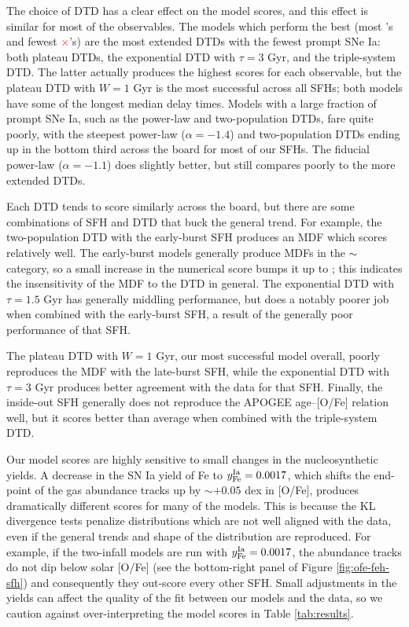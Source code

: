 \documentclass[twocolumn,twocolappendix,linenumbers]{aastex631}
\newcommand{\yes}{\textcolor{green}{\checkmark}\xspace}
\newcommand{\meh}{\textcolor{black}{$\sim$}\xspace}
\newcommand{\no}{\textcolor{red}{$\times$}\xspace}
\begin{document}
The choice of DTD has a clear effect on the model scores, and this effect is similar for most of the observables. The models which perform the best (most \yes's and fewest \no's) are the most extended DTDs with the fewest prompt SNe Ia: both plateau DTDs, the exponential DTD with $\tau=3$ Gyr, and the triple-system DTD. The latter actually produces the highest scores for each observable, but the plateau DTD with $W=1$ Gyr is the most successful across all SFHs; both models have some of the longest median delay times. Models with a large fraction of prompt SNe Ia, such as the power-law and two-population DTDs, fare quite poorly, with the steepest power-law ($\alpha=-1.4$) and two-population DTDs ending up in the bottom third across the board for most of our SFHs. The fiducial power-law ($\alpha=-1.1$) does slightly better, but still compares poorly to the more extended DTDs.

Each DTD tends to score similarly across the board, but there are some combinations of SFH and DTD that buck the general trend. For example, the two-population DTD with the early-burst SFH produces an MDF which scores relatively well. The early-burst models generally produce MDFs in the \meh category, so a small increase in the numerical score bumps it up to \yes; this indicates the insensitivity of the MDF to the DTD in general. The exponential DTD with $\tau=1.5$ Gyr has generally middling performance, but does a notably poorer job when combined with the early-burst SFH, a result of the generally poor performance of that SFH. 

The plateau DTD with $W=1$ Gyr, our most successful model overall, poorly reproduces the MDF with the late-burst SFH, while the exponential DTD with $\tau=3$ Gyr produces better agreement with the data for that SFH. Finally, the inside-out SFH generally does not reproduce the APOGEE age--[O/Fe] relation well, but it scores better than average when combined with the triple-system DTD.

Our model scores are highly sensitive to small changes in the nucleosynthetic yields. A decrease in the SN Ia yield of Fe to $y_{\rm Fe}^{\rm Ia}=0.0017$, which shifts the end-point of the gas abundance tracks up by $\sim+0.05$ dex in [O/Fe], produces dramatically different scores for many of the models. This is because the KL divergence tests penalize distributions which are not well aligned with the data, even if the general trends and shape of the distribution are reproduced. For example, if the two-infall models are run with $y_{\rm Fe}^{\rm Ia}=0.0017$, the abundance tracks do not dip below solar [O/Fe] (see the bottom-right panel of Figure \ref{fig:ofe-feh-sfh}) and consequently they out-score every other SFH. Small adjustments in the yields can affect the quality of the fit between our models and the data, so we caution against over-interpreting the model scores in Table \ref{tab:results}.
\end{document}
